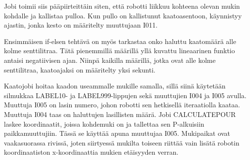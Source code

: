 Jobi toimii siis pääpiirteittäin siten, että robotti liikkuu kohteena olevan mukin kohdalle ja kallistaa pulloa. Kun pullo on kallistunut kaatoasentoon, käynnistyy ajastin, jonka kesto on määritelty muuttujaan I011.

Ensimmäisen if-elsen tehtävä on myös tarkastaa onko haluttu kaatomäärä alle kolme senttilitraa. Tätä pienemmillä määrillä yllä kuvattu lineaarinen funktio antaisi negatiivisen ajan. Niinpä kaikilla määrillä, jotka ovat alle kolme senttilitraa, kaatoajaksi on määritelty yksi sekunti.

Kaatojobi hoitaa kaadon useammalle mukille samalla, sillä siinä käytetään silmukkaa LABEL10- ja LABEL999-lippujen sekä muuttujien I004 ja I005 avulla. Muuttuja I005 on lasin numero, johon robotti sen hetkisellä iteraatiolla kaataa. Muuttuja I004 taas on haluttujen lasillisten määrä. Jobi CALCULATEPOUR laskee koordinaatit, joissa kohdemuki on ja tallettaa sen P-alkuisiin paikkamuuttujiin. Tässä se käyttää apuna muuttujaa I005. Mukipaikat ovat vaakasuorassa rivissä, joten siirtyessä mukilta toiseen riittää vain lisätä robotin koordinaatiston x-koordinaattia mukien etäisyyden verran.

